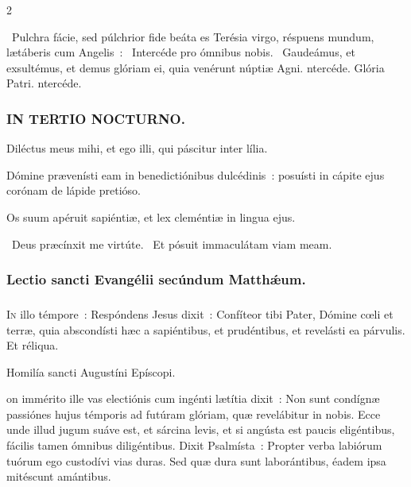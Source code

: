 \documentclass[9pt,twoside]{extarticle}
\begin{document}
\begin{multicols}{2}
{\begin{tightlist}{}
\item {}~Pulchra fácie, sed púlchrior fide beáta es Terésia virgo, réspuens mundum, lætáberis cum Angelis~: \textred{*}~Intercéde pro ómnibus nobis. ~Gaudeámus, et exsultémus, et demus glóriam ei, quia venérunt núptiæ Agni. ntercéde. Glória Patri. ntercéde.
\end{tightlist}

\subsubsection*{\center \textsc{IN TERTIO NOCTURNO.}}
\begin{tightlist}{}
\item {} Diléctus meus mihi, et ego illi, qui páscitur inter lília.
\item {} Dómine prævenísti eam in benedictiónibus dulcédinis~: posuísti in cápite ejus corónam de lápide pretióso.
\item {} Os suum apéruit sapiéntiæ, et lex cleméntiæ in lingua ejus. 
\item {}~Deus præcínxit me virtúte. ~Et pósuit immaculátam viam meam.
\end{tightlist}

\subsubsection*{\center Lectio sancti Evangélii secúndum Matthǽum.}
\subsubsection*{\center {}}
\lettrine{I}n illo témpore~: Respóndens Jesus dixit~: Confíteor tibi Pater, Dómine cœli et terræ, quia abscondísti hæc a sapiéntibus, et prudéntibus, et revelásti ea párvulis. Et réliqua.

\begin{center}Homilía sancti Augustíni Epíscopi.\\
\end{center}
on immérito ille vas electiónis cum ingénti lætítia dixit~: Non sunt condígnæ passiónes hujus témporis ad futúram glóriam, quæ revelábitur in nobis. Ecce unde illud jugum suáve est, et sárcina levis, et si angústa est paucis eligéntibus, fácilis tamen ómnibus diligéntibus. Dixit Psalmísta~: Propter verba labiórum tuórum ego custodívi vias duras. Sed quæ dura sunt laborántibus, éadem ipsa mitéscunt amántibus.

}
\end{multicols}
\end{document}
